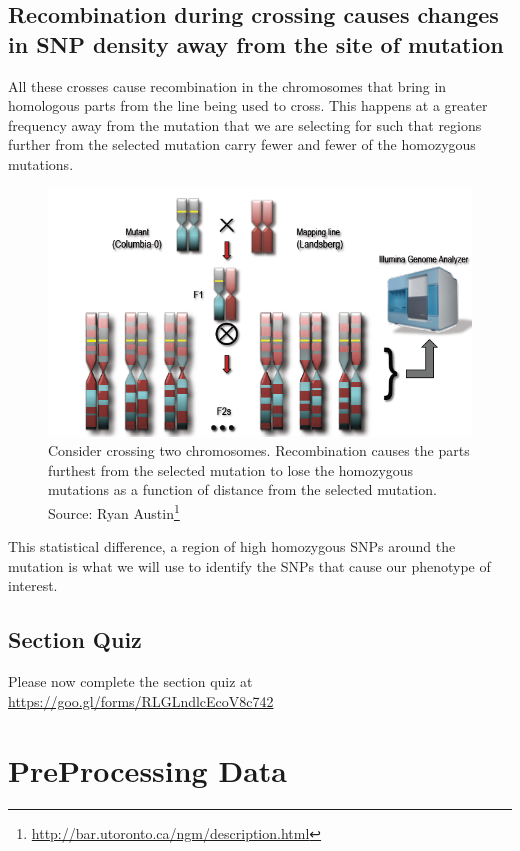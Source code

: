 \documentclass[12pt,]{book}
\let\rmarkdownfootnote\footnote%
\def\footnote{\protect\rmarkdownfootnote}
\renewcommand{\href}[2]{#2\footnote{\url{#1}}}
\theoremstyle{definition}
\theoremstyle{definition}
\theoremstyle{remark}
\begin{document}
\section{Recombination during crossing causes changes in SNP density
away from the site of
mutation}\label{recombination-during-crossing-causes-changes-in-snp-density-away-from-the-site-of-mutation}

All these crosses cause recombination in the chromosomes that bring in
homologous parts from the line being used to cross. This happens at a
greater frequency away from the mutation that we are selecting for such
that regions further from the selected mutation carry fewer and fewer of
the homozygous mutations.






\begin{figure}
\includegraphics[width=4.58in]{assets/ngm} \caption{Consider crossing two chromosomes. Recombination causes
the parts furthest from the selected mutation to lose the homozygous
mutations as a function of distance from the selected mutation. Source:
\href{http://bar.utoronto.ca/ngm/description.html}{Ryan Austin}}\label{fig:ngm}
\end{figure}

This statistical difference, a region of high homozygous SNPs around the
mutation is what we will use to identify the SNPs that cause our
phenotype of interest.

\section{Section Quiz}\label{section-quiz}

Please now complete the section quiz at
\url{https://goo.gl/forms/RLGLndlcEcoV8c742}

\chapter{PreProcessing Data}\label{preprocessing-data}
\end{document}
